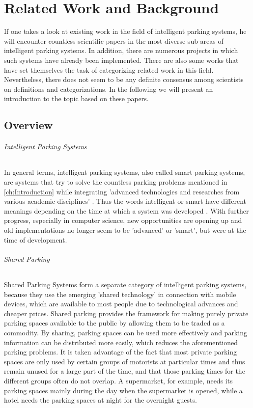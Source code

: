 \chapter{Related Work and Background}
\label{ch:Related Work and Background}
If one takes a look at existing work in the field of intelligent parking systems, he will encounter countless scientific papers in the most diverse sub-areas of intelligent parking systems. In addition, there are numerous projects in which such systems have already been implemented. There are also some works that have set themselves the task of categorizing related work in this field. Nevertheless, there does not seem to be any definite consensus among scientists on definitions and categorizations. In the following we will present an introduction to the topic based on these papers.

\section{Overview}

\subparagraph{Intelligent Parking Systems}
In general terms, intelligent parking systems, also called smart parking systems, are systems that try to solve the countless parking problems mentioned in \ref{ch:Introduction} while integrating 'advanced technologies and researches from various academic disciplines' \cite{idris2009car}. Thus the words intelligent or smart have different meanings depending on the time at which a system was developed \cite{fraifer2016investigation}. With further progress, especially in computer science, new opportunities are opening up and old implementations no longer seem to be 'advanced' or 'smart', but were at the time of development.
\subparagraph{Shared Parking}
Shared Parking Systems form a separate category of intelligent parking systems, because they use the emerging 'shared technology' in connection with mobile devices, which are available to most people due to technological advances and cheaper prices. Shared parking provides the framework for making purely private parking spaces available to the public by allowing them to be traded as a commodity. \cite{itdp2014shared} By sharing, parking spaces can be used more effectively and parking information can be distributed more easily, which reduces the aforementioned parking problems. It is taken advantage of the fact that most private parking spaces are only used by certain groups of motorists at particular times and thus remain unused for a large part of the time, and that those parking times for the different groups often do not overlap\cite{vtpi2015shared}. A supermarket, for example, needs its parking spaces mainly during the day when the supermarket is opened, while a hotel needs the parking spaces at night for the overnight guests.\\
